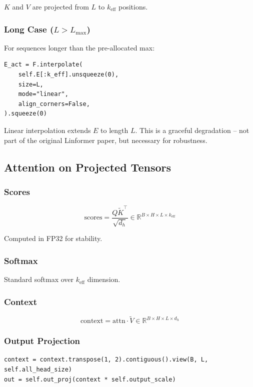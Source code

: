$K$ and $V$ are projected from $L$ to $k_\text{eff}$ positions.

\subsubsection{Long Case ($L > L_\text{max}$)}

For sequences longer than the pre-allocated max:

\begin{lstlisting}
E_act = F.interpolate(
    self.E[:k_eff].unsqueeze(0),
    size=L,
    mode="linear",
    align_corners=False,
).squeeze(0)
\end{lstlisting}

Linear interpolation extends $E$ to length $L$. This is a graceful 
degradation -- not part of the original Linformer paper, but necessary for 
robustness.

\subsection{Attention on Projected Tensors}

\subsubsection{Scores}

\[
\text{scores} = \frac{Q \tilde{K}^\top}{\sqrt{d_h}} \in \mathbb{R}^{B \times H \times L \times k_\text{eff}}
\tag{4.1}
\]

Computed in FP32 for stability.

\subsubsection{Softmax}

Standard softmax over $k_\text{eff}$ dimension.

\subsubsection{Context}

\[
\text{context} = \text{attn} \cdot \tilde{V} \in \mathbb{R}^{B \times H \times L \times d_h}
\tag{4.2}
\]

\subsubsection{Output Projection}

\begin{lstlisting}
context = context.transpose(1, 2).contiguous().view(B, L, self.all_head_size)
out = self.out_proj(context * self.output_scale)
\end{lstlisting}

